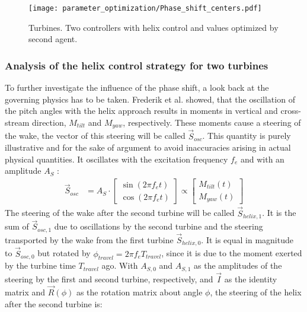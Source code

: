 \begin{figure}
	\centering
	\texttt{[image: parameter\_optimization/Phase\_shift\_centers.pdf]}
	\caption{ Turbines. Two controllers with helix control and values optimized by second agent.}
	\label{fig:phase_shift}
\end{figure}
\subsubsection{Analysis of the helix control strategy for two turbines}
To further investigate the influence of the phase shift, a look back at the governing physics has to be taken. Frederik et al. \cite{frederik_helix_2020} showed, that the oscillation of the pitch angles with the helix approach results in moments in vertical and cross-stream direction, $M_{tilt}$ and $M_{yaw}$, respectively. These moments cause a steering of the wake, the vector of this steering will be called $\vec{S}_{osc}$. This quantity is purely illustrative and for the sake of argument to avoid inaccuracies arising in actual physical quantities. It oscillates with the excitation frequency $f_e$ and with an amplitude $A_S$ :
\begin{align}
\vec{S}_{osc} &=
A_S \cdot
\begin{bmatrix}
\sin(2\pi f_e t) \\
\cos(2\pi f_e t)
\end{bmatrix} 
\propto
\begin{bmatrix}
M_{tilt}(t) \\
M_{yaw}(t)
\end{bmatrix} 
\end{align}
The steering of the wake after the second turbine will be called $\vec{S}_{helix,1}$. It is the sum of $\vec{S}_{osc,1}$ due to oscillations by the second turbine and the steering transported by the wake from the first turbine $\vec{S}_{helix,0}$. It is equal in magnitude to $\vec{S}_{osc,0}$ but rotated by $\phi_{travel}=2 \pi f_e T_{travel}$, since it is due to the moment exerted by the turbine time $T_{travel}$ ago. With $A_{S,0}$ and $A_{S,1}$ as the amplitudes of the steering by the first and second turbine, respectively, and $\vec{I}$ as the identity matrix and $\vec{R}(\phi)$ as the rotation matrix about angle $\phi$, the steering of the helix after the second turbine is:
